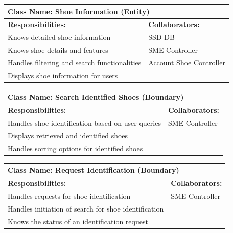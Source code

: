 \documentclass[]{article}
\begin{document}
\begin{table}[H]
    \centering
    \begin{tabular}{|p{}|p{}|}
        \hline
        \multicolumn{2}{|l|}{\textbf{Class Name:} Shoe Information (Entity)} \\
        \hline
        \textbf{Responsibilities:} & \textbf{Collaborators:} \\
        \hline
        Knows detailed shoe information & SSD DB \\
        Knows shoe details and features & SME Controller \\
        Handles filtering and search functionalities & Account Shoe Controller \\
        Displays shoe information for users & \\
        \hline
    \end{tabular}
    \label{tab:shoe_information}
\end{table}

\begin{table}[H]
    \centering
    \begin{tabular}{|p{}|p{}|}
        \hline
        \multicolumn{2}{|l|}{\textbf{Class Name:} Search Identified Shoes (Boundary)} \\
        \hline
        \textbf{Responsibilities:} & \textbf{Collaborators:} \\
        \hline
        Handles shoe identification based on user queries & SME Controller \\
        Displays retrieved and identified shoes &  \\
        Handles sorting options for identified shoes &  \\
        \hline
    \end{tabular}
    \label{tab:search_identified_shoes}
\end{table}


\begin{table}[H]
    \centering
    \begin{tabular}{|p{}|p{}|}
        \hline
        \multicolumn{2}{|l|}{\textbf{Class Name:} Request Identification (Boundary)} \\
        \hline
        \textbf{Responsibilities:} & \textbf{Collaborators:} \\
        \hline
        Handles requests for shoe identification & SME Controller \\
        Handles initiation of search for shoe identification &  \\
        Knows the status of an identification request  & \\
        \hline
    \end{tabular}
    \label{tab:request_identification}
\end{table}
\end{document}
